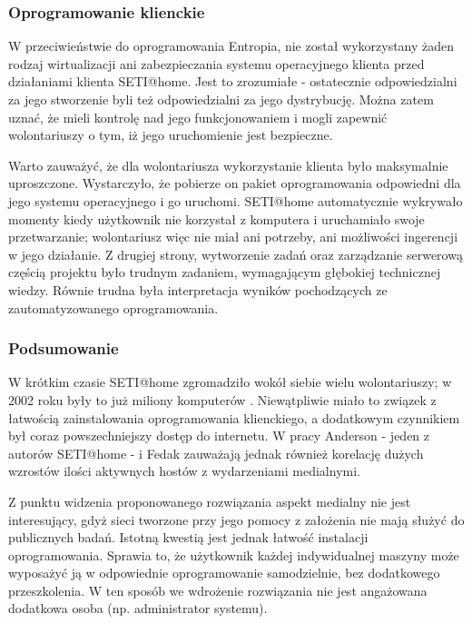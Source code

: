 \documentclass[12pt,a4paper,twoside]{article}
\begin{document}
\subsubsection{Oprogramowanie klienckie}

W przeciwieństwie do oprogramowania Entropia, nie został wykorzystany żaden rodzaj wirtualizacji ani zabezpieczania systemu operacyjnego klienta przed działaniami klienta SETI@home. Jest to zrozumiałe - ostatecznie odpowiedzialni za jego stworzenie byli też odpowiedzialni za jego dystrybucję. Można zatem uznać, że mieli kontrolę nad jego funkcjonowaniem i mogli zapewnić wolontariuszy o tym, iż jego uruchomienie jest bezpieczne.

Warto zauważyć, że dla wolontariusza wykorzystanie klienta było maksymalnie uproszczone. Wystarczyło, że pobierze on pakiet oprogramowania odpowiedni dla jego systemu operacyjnego i go uruchomi. SETI@home automatycznie wykrywało momenty kiedy użytkownik nie korzystał z komputera i uruchamiało swoje przetwarzanie; wolontariusz więc nie miał ani potrzeby, ani możliwości ingerencji w jego działanie. Z drugiej strony, wytworzenie zadań oraz zarządzanie serwerową częścią projektu było trudnym zadaniem, wymagającym głębokiej technicznej wiedzy. Równie trudna była interpretacja wyników pochodzących ze zautomatyzowanego oprogramowania.

\subsubsection{Podsumowanie}

W krótkim czasie SETI@home zgromadziło wokół siebie wielu wolontariuszy; w 2002 roku były to już miliony komputerów \cite{seti}. Niewątpliwie miało to związek z łatwością zainstalowania oprogramowania klienckiego, a dodatkowym czynnikiem był coraz powszechniejszy dostęp do internetu. W pracy \cite{computational} Anderson - jeden z autorów SETI@home - i Fedak zauważają jednak również korelację dużych wzrostów ilości aktywnych hostów z wydarzeniami medialnymi.

Z punktu widzenia proponowanego rozwiązania aspekt medialny nie jest interesujący, gdyż sieci tworzone przy jego pomocy z założenia nie mają służyć do publicznych badań. Istotną kwestią jest jednak łatwość instalacji oprogramowania. Sprawia to, że użytkownik każdej indywidualnej maszyny może wyposażyć ją w odpowiednie oprogramowanie samodzielnie, bez dodatkowego przeszkolenia. W ten sposób we wdrożenie rozwiązania nie jest angażowana dodatkowa osoba (np. administrator systemu).
\end{document}
